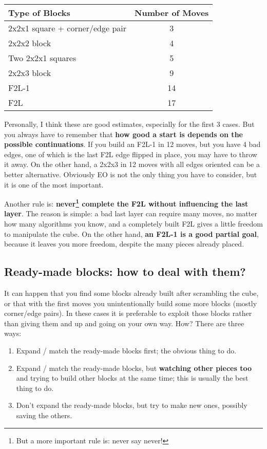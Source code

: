\documentclass[11pt,a4paper]{book}
\begin{document}
\bigskip
\begin{center}
\begin{tabular}{|l|c|}
\hline
Type of Blocks & Number of Moves\\
\hline
2x2x1 square + corner/edge pair & 3\\
\hline
2x2x2 block & 4\\
\hline
Two 2x2x1 squares & 5\\
\hline
2x2x3 block & 9\\
\hline
F2L-1 & 14\\
\hline
F2L & 17\\
\hline
\end{tabular}
\end{center}

Personally, I think these are good estimates, especially for the first 3 cases. But you always have to remember that \textbf{how good a start is depends on the possible continuations}. If you build an F2L-1 in 12 moves, but you have 4 bad edges, one of which is the last F2L edge flipped in place, you may have to throw it away. On the other hand, a 2x2x3 in 12 moves with all edges oriented can be a better alternative. Obviously EO is not the only thing you have to consider, but it is one of the most important.

Another rule is: \textbf{never\footnote{But a more important rule is: never say never!} complete the F2L without influencing the last layer}. The reason is simple: a bad last layer can require many moves, no matter how many algorithms you know, and a completely built F2L gives a little freedom to manipulate the cube. On the other hand, \textbf{an F2L-1 is a good partial goal}, because it leaves you more freedom, despite the many pieces already placed.

\subsection{Ready-made blocks: how to deal with them?}
\label{ready-made}

It can happen that you find some blocks already built after scrambling the cube, or that with the first moves you unintentionally build some more blocks (mostly corner/edge pairs). In these cases it is preferable to exploit those blocks rather than giving them and up and going on your own way. How? There are three ways:

\begin{enumerate}
\item Expand / match the ready-made blocks first; the obvious thing to do.
\item Expand / match the ready-made blocks, but \textbf{watching other pieces too} and trying to build other blocks at the same time; this is usually the best thing to do.
\item Don't expand the ready-made blocks, but try to make new ones, possibly saving the others.
\end{enumerate}
\end{document}
